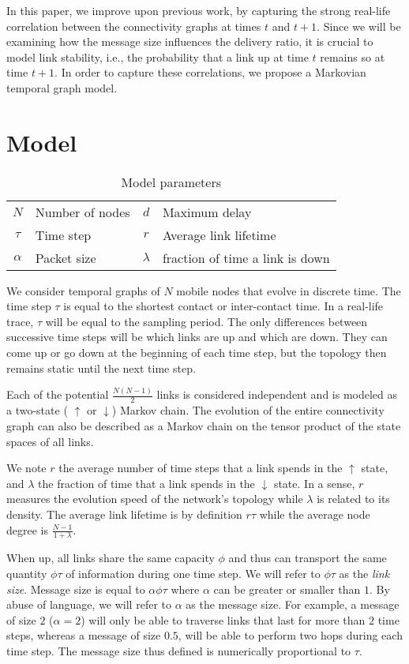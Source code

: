 \documentclass{sig-alt-release2}
\begin{document}
In this paper, we improve upon previous work, by capturing the strong
real-life correlation between the connectivity graphs at times $t$ and
$t+1$. Since we will be examining how the message size influences the
delivery ratio, it is crucial to model link stability, i.e., the
probability that a link up at time $t$ remains so at time $t+1$. In
order to capture these correlations, we propose a Markovian temporal
graph model.

\section{Model}
\label{sec:model}
\begin{table}[t]
  \centering
  \small
  \caption{Model parameters}
  \begin{tabular}{cl|cl}
  \hline
  $N$ & Number of nodes  &  $d$ & Maximum delay \\
  $\tau$ & Time step &  $r$ & Average link lifetime \\
  $\alpha$ & Packet size &  $\lambda$ & fraction of time a link is down \\
  \hline
  \end{tabular}
  \label{param_desc}
\end{table}

We consider temporal graphs of $N$ mobile nodes that evolve in
discrete time. The time step $\tau$ is equal to the shortest contact
or inter-contact time. In a real-life trace, $\tau$ will be equal to
the sampling period. The only differences between successive time
steps will be which links are up and which are down. They can come up
or go down at the beginning of each time step, but the topology then
remains static until the next time step. 

Each of the potential $\frac{N(N-1)}{2}$ links is considered
independent and is modeled as a two-state ( $\uparrow$ or
$\downarrow$) Markov chain. 
 The evolution of the entire connectivity
graph can also be described as a Markov chain on the tensor product of
the state spaces of all links. 

We note $r$ the average number of time steps that a link spends in the
$\uparrow$ state, and $\lambda$ the fraction of time that a link
spends in the $\downarrow$ state. In a sense, $r$ measures the
evolution speed of the network's topology while $\lambda$ is related
to its density. The average link lifetime is by definition $r \tau$
while the average node degree is $\frac{N-1}{1+\lambda}$. 

When up, all links share the same capacity $\phi$ and thus can
transport the same quantity $\phi \tau$ of information during one
time step. We will refer to $\phi \tau$ as the \emph{link
  size}. Message size is equal to $\alpha \phi \tau$ where $\alpha$
can be greater or smaller than $1$. By abuse of language, we will
refer to $\alpha$ as the message size. For example, a message of size
$2$ ($\alpha=2$) will only be able to traverse links that last for
more than $2$ time steps, whereas a message of size $0.5$, will be
able to perform two hops during each time step. The message size thus
defined is numerically proportional to $\tau$.
\end{document}
